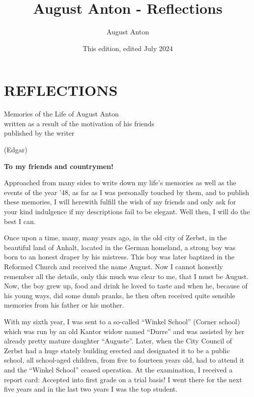 \documentclass{article}
\title{August Anton - Reflections}
\author{August Anton}
\date{This edition, edited July 2024}
\begin{document}
\maketitle

\section{REFLECTIONS}\label{reflections}

Memories of the Life of August Anton\\
written as a result of the motivation of his friends\\
published by the writer

(Edgar)

\textbf{To my friends and countrymen!}

Approached from many sides to write down my life's memories as well as the events of the year '48, as far as I was personally touched by them, and to publish these memories, I will herewith fulfill the wish of my friends and only ask for your kind indulgence if my descriptions fail to be elegant. Well then, I will do the best I can.

Once upon a time, many, many years ago, in the old city of Zerbst, in the beautiful land of Anhalt, located in the German homeland, a strong boy was born to an honest draper by his mistress. This boy was later baptized in the Reformed Church and received the name August. Now I cannot honestly remember all the details, only this much was clear to me, that I must be August. Now, the boy grew up, food and drink he loved to taste and when he, because of his young ways, did some dumb pranks, he then often received quite sensible memories from his father or his mother.

With my sixth year, I was sent to a so-called ``Winkel School'' (Corner school) which was run by an old Kantor widow named ``Durre'' and was assisted by her already pretty mature daughter ``Auguste''. Later, when the City Council of Zerbst had a huge stately building erected and designated it to be a public school, all school-aged children, from five to fourteen years old, had to attend it and the ``Winkel School'' ceased operation. At the examination, I received a report card: Accepted into first grade on a trial basis! I went there for the next five years and in the last two years I was the top student.
\end{document}
